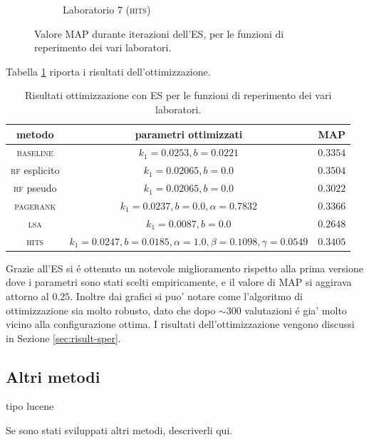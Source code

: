 \begin{figure}
\begin{subfigure}[htpb]{0.475\textwidth}
            \caption[]%
            {{\small Laboratorio 7 (\textsc{hits})}}    
            \label{fig:es_lab7}
        \end{subfigure}
        \caption[ The average and standard deviation of critical parameters ]
        {\small Valore MAP durante iterazioni dell'ES, per le funzioni di reperimento dei vari laboratori.} 
        \label{fig:es_all}
\end{figure}
Tabella \ref{tab:es} riporta i risultati dell'ottimizzazione.
\begin{table}[htpb]

\begin{center}
\begin{tabular}{|c|c|c|}
\hline
metodo & parametri ottimizzati & MAP \\
 \hline
\textsc{baseline} & $k_1 = 0.0253, b = 0.0221$ & $0.3354$ \\
\textsc{rf} esplicito & $k_1 = 0.02065, b = 0.0$ & $0.3504$ \\
\textsc{rf} pseudo & $k_1 = 0.02065, b = 0.0$ & $0.3022$ \\
\textsc{pagerank} & $k_1 = 0.0237, b = 0.0, \alpha=0.7832$ & $0.3366$ \\
\textsc{lsa} & $k_1 = 0.0087, b = 0.0$ & $0.2648$ \\
\textsc{hits} & $k_1 = 0.0247, b = 0.0185, \alpha=1.0, \beta=0.1098, \gamma=0.0549$ & $0.3405$ \\
\hline
\end{tabular}
\end{center}
\caption{Risultati ottimizzazione con ES per le funzioni di reperimento dei vari laboratori.}
\label{tab:es}
\end{table}

Grazie all'ES si \'e ottenuto un notevole miglioramento rispetto alla prima versione dove i parametri sono stati scelti empiricamente, e il valore di MAP si aggirava attorno al $0.25$. Inoltre dai grafici si puo' notare come l'algoritmo di ottimizzazione sia molto robusto, dato che dopo $\sim{300}$ valutazioni \'e gia' molto vicino alla configurazione ottima. I risultati dell'ottimizzazione vengono discussi in Sezione \ref{sec:risult-sper}.

\subsection{Altri metodi}
tipo lucene
\label{sec:altri-metodi}

Se sono stati sviluppati altri metodi, descriverli qui.

